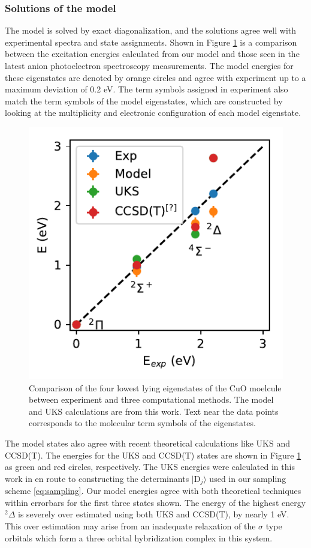 \documentclass[12pt]{article}
\begin{document}
\subsubsection{Solutions of the model}
The model is solved by exact diagonalization, and the solutions agree well with experimental spectra and state assignments.
Shown in Figure \ref{fig:comp} is a comparison between the excitation energies calculated from our model and those seen in the latest anion photoelectron spectroscopy measurements.
The model energies for these eigenstates are denoted by orange circles and agree with experiment up to a maximum deviation of 0.2 eV.
The term symbols assigned in experiment also match the term symbols of the model eigenstates, which are constructed by looking at the multiplicity and electronic configuration of each model eigenstate. 

\begin{figure}
\centering
\includegraphics{./figs/comp.pdf}
\caption{Comparison of the four lowest lying eigenstates of the CuO moelcule between experiment and three computational methods. The model and UKS calculations are from this work. Text near the data points corresponds to the molecular term symbols of the eigenstates.}
\label{fig:comp}
\end{figure}

The model states also agree with recent theoretical calculations like UKS and CCSD(T).
The energies for the UKS and CCSD(T) states are shown in Figure \ref{fig:comp} as green and red circles, respectively.
The UKS energies were calculated in this work in en route to constructing the determinants $|\text{D}_j\rangle$ used in our sampling scheme \eqref{eq:sampling}.
Our model energies agree with both theoretical techniques within errorbars for the first three states shown.
The energy of the highest energy $^2\Delta$ is severely over estimated using both UKS and CCSD(T), by nearly 1 eV.
This over estimation may arise from an inadequate relaxation of the $\sigma$ type orbitals which form a three orbital hybridization complex in this system.
\end{document}
